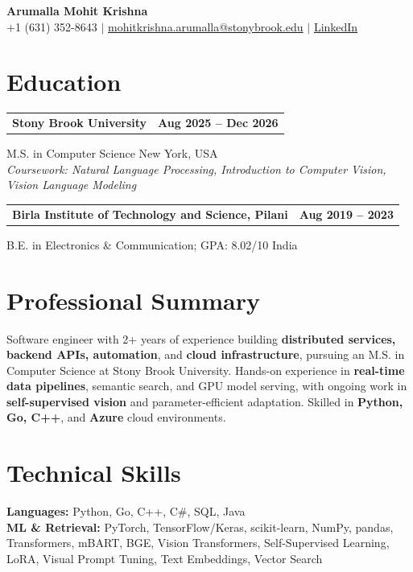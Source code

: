 \documentclass[letterpaper,10pt]{article}
\makeatletter
\newcommand{\entry}[2]{%
  \noindent
  \begin{tabularx}{\linewidth}
    {@{}>{\raggedright\arraybackslash}X@{\hspace{6pt}}r@{}}
    \textbf{#1} & #2
  \end{tabularx}\par
}
\makeatother
\begin{document}
\begin{center}
    {\LARGE\bfseries Arumalla Mohit Krishna}\\[3pt]
    +1 (631) 352-8643 $|$
    \href{mailto:mohitkrishna.arumalla@stonybrook.edu}
    {mohitkrishna.arumalla@stonybrook.edu} $|$
    \href{https://linkedin.com/in/mohit-krishna-arumalla}
    {LinkedIn}
\end{center}
\vspace{-8pt}

\section{Education}

\entry
  {\textbf{Stony Brook University}}
  {\textbf{Aug 2025 -- Dec 2026}}

M.S. in Computer Science \hfill New York, USA\\
\textit{
Coursework: Natural Language Processing,
Introduction to Computer Vision, Vision Language Modeling
}
\vspace{3pt}

\entry
  {\textbf{Birla Institute of Technology and Science, Pilani}}
  {\textbf{Aug 2019 -- 2023}}

B.E. in Electronics \& Communication; GPA: 8.02/10 \hfill India
\section{Professional Summary}

Software engineer with 2+ years of experience building \textbf{distributed services, backend APIs, automation}, and \textbf{cloud infrastructure}, pursuing an M.S. in Computer Science at Stony Brook University. Hands-on experience in \textbf{real-time data pipelines}, semantic search, and GPU model serving, with ongoing work in \textbf{self-supervised vision} and parameter-efficient adaptation. Skilled in \textbf{Python, Go, C++}, and \textbf{Azure} cloud environments.
\section{Technical Skills}

\textbf{Languages:}
Python, Go, C++, C\#, SQL, Java\\

\textbf{ML \& Retrieval:}
PyTorch, TensorFlow/Keras, scikit-learn, NumPy, pandas,
Transformers, mBART, BGE, Vision Transformers,
Self-Supervised Learning, LoRA, Visual Prompt Tuning,
Text Embeddings, Vector Search\\
\end{document}
